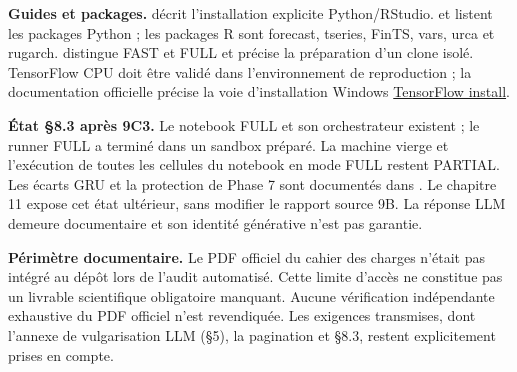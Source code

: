 \textbf{Guides et packages.}  décrit l’installation explicite Python/RStudio.  et  listent les packages Python ; les packages R sont forecast, tseries, FinTS, vars, urca et rugarch.  distingue FAST et FULL et précise la préparation d’un clone isolé. TensorFlow CPU doit être validé dans l’environnement de reproduction ; la documentation officielle précise la voie d’installation Windows \href{https://www.tensorflow.org/install/pip}{TensorFlow install}.



\textbf{État §8.3 après 9C3.} Le notebook FULL et son orchestrateur existent ; le runner FULL a terminé dans un sandbox préparé. La machine vierge et l’exécution de toutes les cellules du notebook en mode FULL restent PARTIAL. Les écarts GRU et la protection de Phase 7 sont documentés dans . Le chapitre 11 expose cet état ultérieur, sans modifier le rapport source 9B. La réponse LLM demeure documentaire et son identité générative n’est pas garantie.



\textbf{Périmètre documentaire.} Le PDF officiel du cahier des charges n’était pas intégré au dépôt lors de l’audit automatisé. Cette limite d’accès ne constitue pas un livrable scientifique obligatoire manquant. Aucune vérification indépendante exhaustive du PDF officiel n’est revendiquée. Les exigences transmises, dont l’annexe de vulgarisation LLM (§5), la pagination et §8.3, restent explicitement prises en compte.
